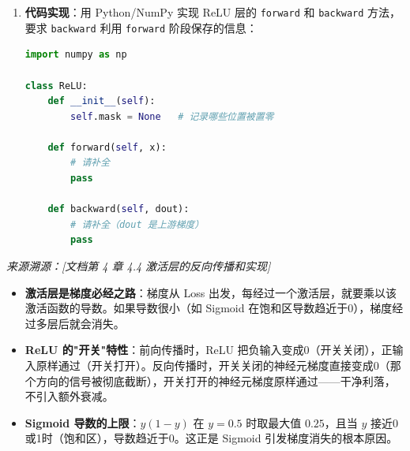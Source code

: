 \documentclass[a4paper,11pt]{ctexart}
\begin{document}
\begin{problembox}
\begin{enumerate}[(1)]
        \item \textbf{代码实现}：用 Python/NumPy 实现 ReLU 层的 \texttt{forward} 和 \texttt{backward} 方法，要求 \texttt{backward} 利用 \texttt{forward} 阶段保存的信息：
        \begin{lstlisting}[language=Python]
import numpy as np

class ReLU:
    def __init__(self):
        self.mask = None   # 记录哪些位置被置零

    def forward(self, x):
        # 请补全
        pass

    def backward(self, dout):
        # 请补全（dout 是上游梯度）
        pass
        \end{lstlisting}
    \end{enumerate}

    \vspace{0.2cm}
    {\color{gray}\small\textit{来源溯源：[文档第 4 章 4.4 激活层的反向传播和实现]}}
\end{problembox}

\begin{beginnerbox}
    \begin{itemize}
        \item \textbf{激活层是梯度必经之路}：梯度从 Loss 出发，每经过一个激活层，就要乘以该激活函数的导数。如果导数很小（如 Sigmoid 在饱和区导数趋近于0），梯度经过多层后就会消失。
        \item \textbf{ReLU 的"开关"特性}：前向传播时，ReLU 把负输入变成0（开关关闭），正输入原样通过（开关打开）。反向传播时，开关关闭的神经元梯度直接变成0（那个方向的信号被彻底截断），开关打开的神经元梯度原样通过——干净利落，不引入额外衰减。
        \item \textbf{Sigmoid 导数的上限}：$y(1-y)$ 在 $y=0.5$ 时取最大值 $0.25$，且当 $y$ 接近0或1时（饱和区），导数趋近于0。这正是 Sigmoid 引发梯度消失的根本原因。
    \end{itemize}
\end{beginnerbox}
\end{document}

